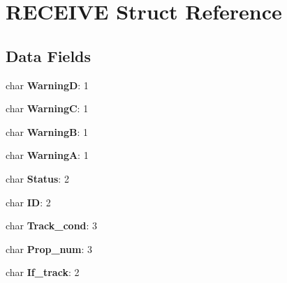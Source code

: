 \hypertarget{struct_r_e_c_e_i_v_e}{}\section{R\+E\+C\+E\+I\+V\+E Struct Reference}
\label{struct_r_e_c_e_i_v_e}
\subsection*{Data Fields}
\begin{DoxyCompactItemize}
\item 
\hypertarget{struct_r_e_c_e_i_v_e_afed4442364de236d169ab42d1667bcc3}{}char {\bfseries Warning\+D}\+: 1\label{struct_r_e_c_e_i_v_e_afed4442364de236d169ab42d1667bcc3}

\item 
\hypertarget{struct_r_e_c_e_i_v_e_ab8a6c42b82acbe1b71ad8eb9fb5d1129}{}char {\bfseries Warning\+C}\+: 1\label{struct_r_e_c_e_i_v_e_ab8a6c42b82acbe1b71ad8eb9fb5d1129}

\item 
\hypertarget{struct_r_e_c_e_i_v_e_a5ff1e7e832731e4f5c2984a7a751d2e0}{}char {\bfseries Warning\+B}\+: 1\label{struct_r_e_c_e_i_v_e_a5ff1e7e832731e4f5c2984a7a751d2e0}

\item 
\hypertarget{struct_r_e_c_e_i_v_e_a47536f4ab39ea7943f18c16b190d23bf}{}char {\bfseries Warning\+A}\+: 1\label{struct_r_e_c_e_i_v_e_a47536f4ab39ea7943f18c16b190d23bf}

\item 
\hypertarget{struct_r_e_c_e_i_v_e_a421a9b892a6c0a7018e5879488c78f35}{}char {\bfseries Status}\+: 2\label{struct_r_e_c_e_i_v_e_a421a9b892a6c0a7018e5879488c78f35}

\item 
\hypertarget{struct_r_e_c_e_i_v_e_a595f6ff5c8c7b1538e28f9b6cb97113f}{}char {\bfseries I\+D}\+: 2\label{struct_r_e_c_e_i_v_e_a595f6ff5c8c7b1538e28f9b6cb97113f}

\item 
\hypertarget{struct_r_e_c_e_i_v_e_af6bd4a76eab8defc66552beba56ef885}{}char {\bfseries Track\+\_\+cond}\+: 3\label{struct_r_e_c_e_i_v_e_af6bd4a76eab8defc66552beba56ef885}

\item 
\hypertarget{struct_r_e_c_e_i_v_e_afcf0d29ca9a87d19c0977213e3df6dae}{}char {\bfseries Prop\+\_\+num}\+: 3\label{struct_r_e_c_e_i_v_e_afcf0d29ca9a87d19c0977213e3df6dae}

\item 
\hypertarget{struct_r_e_c_e_i_v_e_a7feaccc950f411e793ef3841ef1d4e58}{}char {\bfseries If\+\_\+track}\+: 2\label{struct_r_e_c_e_i_v_e_a7feaccc950f411e793ef3841ef1d4e58}


\end{DoxyCompactItemize}
